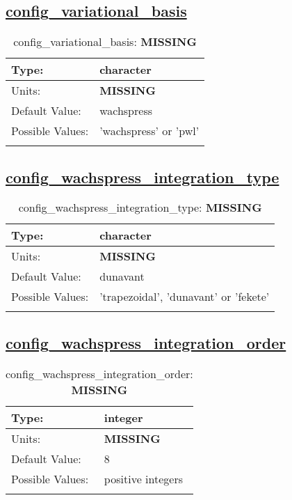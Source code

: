\subsection[config\_variational\_basis]{\hyperref[sec:nm_tab_velocity_solver]{config\_variational\_basis}}
\label{subsec:nm_sec_config_variational_basis}
\begin{center}
\begin{longtable}{| p{2.0in} || p{4.0in} |}
    \hline
    Type: & character \\
    \hline
    Units: & {\bf \color{red} MISSING} \\
    \hline
    Default Value: & wachspress \\
    \hline
    Possible Values: & 'wachspress' or 'pwl' \\
    \hline
    \caption{config\_variational\_basis: {\bf \color{red} MISSING}}
\end{longtable}
\end{center}
\subsection[config\_wachspress\_integration\_type]{\hyperref[sec:nm_tab_velocity_solver]{config\_wachspress\_integration\_type}}
\label{subsec:nm_sec_config_wachspress_integration_type}
\begin{center}
\begin{longtable}{| p{2.0in} || p{4.0in} |}
    \hline
    Type: & character \\
    \hline
    Units: & {\bf \color{red} MISSING} \\
    \hline
    Default Value: & dunavant \\
    \hline
    Possible Values: & 'trapezoidal', 'dunavant' or 'fekete' \\
    \hline
    \caption{config\_wachspress\_integration\_type: {\bf \color{red} MISSING}}
\end{longtable}
\end{center}
\subsection[config\_wachspress\_integration\_order]{\hyperref[sec:nm_tab_velocity_solver]{config\_wachspress\_integration\_order}}
\label{subsec:nm_sec_config_wachspress_integration_order}
\begin{center}
\begin{longtable}{| p{2.0in} || p{4.0in} |}
    \hline
    Type: & integer \\
    \hline
    Units: & {\bf \color{red} MISSING} \\
    \hline
    Default Value: & 8 \\
    \hline
    Possible Values: & positive integers \\
    \hline
    \caption{config\_wachspress\_integration\_order: {\bf \color{red} MISSING}}
\end{longtable}
\end{center}
